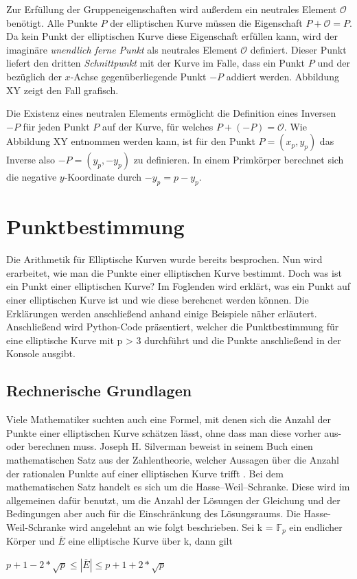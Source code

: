 Zur Erfüllung der Gruppeneigenschaften wird außerdem ein neutrales Element $\mathcal{O}$ benötigt. Alle Punkte $P$ der elliptischen Kurve müssen die Eigenschaft $P + \mathcal{O} = P$. Da kein Punkt der elliptischen Kurve diese Eigenschaft erfüllen kann, wird der imaginäre \textit{unendlich ferne Punkt} als neutrales Element $\mathcal{O}$ definiert. Dieser Punkt liefert den dritten \textit{Schnittpunkt} mit der Kurve im Falle, dass ein Punkt $P$ und der bezüglich der $x$-Achse gegenüberliegende Punkt $-P$ addiert werden. Abbildung XY zeigt den Fall grafisch.

Die Existenz eines neutralen Elements ermöglicht die Definition eines Inversen $-P$ für jeden Punkt $P$ auf der Kurve, für welches $P + (-P) = \mathcal{O}$. Wie Abbildung XY  entnommen werden kann, ist für den Punkt $P = (x_p, y_p)$ das Inverse also $-P = (y_p, -y_p)$ zu definieren. In einem Primkörper berechnet sich die negative $y$-Koordinate durch $-y_p = p - y_p$.
 
\section{Punktbestimmung}
Die Arithmetik für Elliptische Kurven wurde bereits besprochen. Nun wird erarbeitet, wie man die Punkte einer elliptischen Kurve bestimmt. Doch was ist ein Punkt einer elliptischen Kurve? Im Foglenden wird erklärt, was ein Punkt auf einer elliptischen Kurve ist und wie diese berehcnet werden können. Die Erklärungen werden anschließend anhand einige Beispiele näher erläutert. Anschließend wird Python-Code präsentiert, welcher die Punktbestimmung für eine elliptische Kurve mit p > 3 durchführt und die Punkte anschließend in der Konsole ausgibt.

\subsection{Rechnerische Grundlagen}
Viele Mathematiker suchten auch eine Formel, mit denen sich die Anzahl der Punkte einer elliptischen Kurve schätzen lässt, ohne dass man diese vorher aus- oder berechnen muss. Joseph H. Silverman beweist in seinem Buch einen mathematischen Satz aus der Zahlentheorie, welcher Aussagen über die Anzahl der rationalen Punkte auf einer elliptischen Kurve trifft \cite[vgl.][S. 138]{silverman}. Bei dem mathematischen Satz handelt es sich um die Hasse–Weil–Schranke. Diese wird im allgemeinen dafür benutzt, um die Anzahl der Lösungen der Gleichung und der Bedingungen aber auch für die Einschränkung des Lösungsraums. Die Hasse-Weil-Schranke wird angelehnt an \cite[vgl.][S. 181]{reinholdhuebl} wie folgt beschrieben. Sei k = $\mathbb{F}_p$ ein endlicher Körper und $\overline{E}$ eine elliptische Kurve über k, dann gilt
\begin{center}
$p + 1 - 2 * \sqrt{p} \leq | \overline{E} | \leq p + 1 + 2 * \sqrt{p}$
\end{center} 

